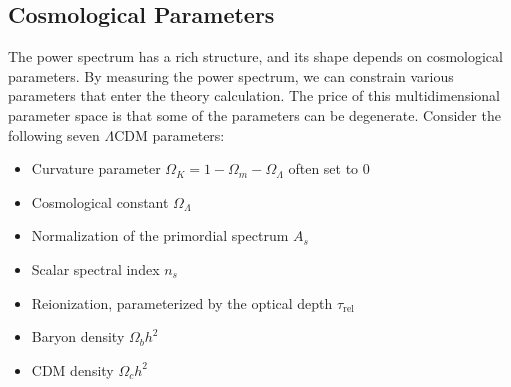 \subsection{Cosmological Parameters}

The power spectrum has a rich structure, and its shape depends on cosmological parameters. By measuring the power spectrum, we can constrain various parameters that enter the theory calculation. The price of this multidimensional parameter space is that some of the parameters can be degenerate. Consider the following seven $\Lambda$CDM parameters:

\begin{itemize}
    \item Curvature parameter $\Omega_K = 1 - \Omega_m - \Omega_\Lambda$ often set to 0
    \item Cosmological constant $\Omega_\Lambda$
    \item Normalization of the primordial spectrum $A_s$
    \item Scalar spectral index $n_s$
    \item Reionization, parameterized by the optical depth $\tau_\text{rel}$
    \item Baryon density $\Omega_b h^2$
    \item CDM density $\Omega_c h^2$
\end{itemize}
